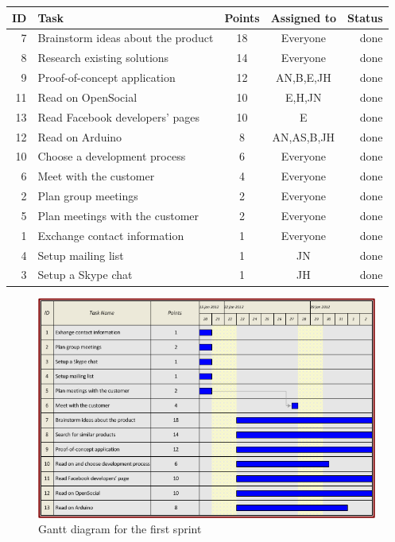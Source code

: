 \begin{table}[ht!]
\begin{tabular}{ | r | l | c | c | r | }

\hline
\textbf{ID} & \textbf{Task} & \textbf{Points} & \textbf{Assigned to} & \textbf{Status} \\
\hline

 7 & Brainstorm ideas about the product		& 18 & Everyone		& done \\
\hline
 8 & Research existing solutions			& 14 & Everyone		& done \\
\hline
 9 & Proof-of-concept application			& 12 & AN,B,E,JH	& done \\
\hline
11 & Read on OpenSocial						& 10 & E,H,JN		& done \\
\hline
13 & Read Facebook developers' pages		& 10  & E			& done\\
\hline
12 & Read on Arduino						& 8  & AN,AS,B,JH	& done \\
\hline
10 & Choose a development process			& 6  & Everyone		& done \\
\hline
 6 & Meet with the customer					& 4  & Everyone		& done \\
\hline
 2 & Plan group meetings					& 2  & Everyone		& done \\
\hline
 5 & Plan meetings with the customer		& 2  & Everyone		& done \\
\hline
 1 & Exchange contact information			& 1  & Everyone		& done \\
\hline
 4 & Setup mailing list						& 1  & JN			& done \\
\hline
 3 & Setup a Skype chat						& 1  & JH			& done \\
\hline

\end{tabular}
\end{table}

\newpage

\begin{figure}[h!]
\centering \includegraphics[scale=0.8]{img/sprints-gantt1.png}
\caption{Gantt diagram for the first sprint}
\label{fig:sprints-gantt1}
\end{figure}

